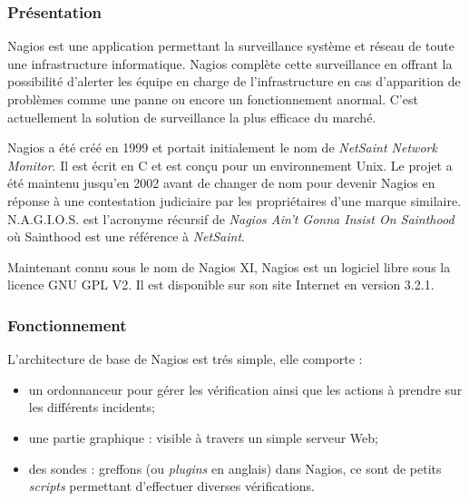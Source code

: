 \subsubsection{Pr\'esentation}

Nagios est une application permettant la surveillance syst\`eme et r\'eseau de toute une infrastructure informatique.
Nagios compl\`ete cette surveillance en offrant la possibilit\'e d'alerter les \'equipe en charge de l'infrastructure en cas d'apparition de probl\`emes comme une panne ou encore un fonctionnement anormal.
C'est actuellement la solution de surveillance la plus efficace du march\'e.

Nagios a \'et\'e cr\'e\'e en 1999 et portait initialement le nom de \textit{NetSaint Network Monitor}.
Il est \'ecrit en C et est con\c{c}u pour un environnement Unix.
Le projet a \'et\'e maintenu jusqu'en 2002 avant de changer de nom pour devenir Nagios en r\'eponse \`a une contestation judiciaire par les propri\'etaires d'une marque similaire.
N.A.G.I.O.S. est l'acronyme r\'ecursif de \og{}\textit{Nagios Ain't Gonna Insist On Sainthood}\fg{} o\`u Sainthood est une r\'ef\'erence \`a \textit{NetSaint}.

Maintenant connu sous le nom de Nagios XI, Nagios est un logiciel libre sous la licence GNU GPL V2. 
Il est disponible sur son site Internet\cite{biblio:siteNagios} en version 3.2.1.

\subsubsection{Fonctionnement}

\noindent L'architecture de base de Nagios est tr\'es simple, elle comporte :

\begin{itemize}
	\item un ordonnanceur pour g\'erer les v\'erification ainsi que les actions \`a prendre sur les diff\'erents incidents;
	\item une partie graphique : visible \`a travers un simple serveur Web;
	\item des sondes : greffons (ou \textit{plugins} en anglais) dans Nagios, ce sont de petits \textit{scripts} permettant d'effectuer diverses v\'erifications.

\end{itemize}

